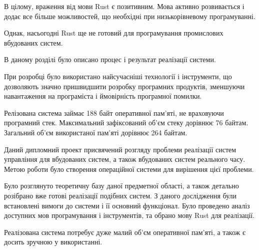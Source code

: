 \documentclass[main.tex]{subfiles}
\begin{document}
В цілому, враження від мови Rust є позитивним. Мова активно розвивається і додає все більше можливостей, що необхідні при низькорівневому програмуванні.

Однак, насьогодні Rust ще не готовий для програмування промислових вбудованих систем.

\chapterconslusions{}

В даному розділі було описано процес і результат реалізації системи.

При розробці було використано найсучасніші технології і інструменти, що дозволяють значно пришвидшити розробку програмних продуктів, зменшуючи навантаження на програміста і ймовірність програмної помилки.

Релізована система займає 188 байт оперативної пам'яті, не враховуючи програмний стек. Максимальний зафіксований об'єм стеку дорівнює 76 байтам. Загальний об'єм використаної пам'яті дорівнює 264 байтам.


Даний дипломний проект присвячений розгляду проблеми реалізації систем управління для вбудованих систем, а також вбудованих систем реального часу. Метою роботи було створення операційної системи для вирішення цієї проблеми.

Було розглянуто теоретичну базу даної предметної області, а також детально розібрано вже готові реалізації подібних систем. З даного дослідження були встановлені вимоги до системи і її основний функціонал. Було проведено аналіз доступних мов програмування і інструментів, та обрано мову Rust для реалізації.

Реалізована система потребує дуже малий об'єм оперативної пам'яті, а також є досить зручною у використанні.
\end{document}
